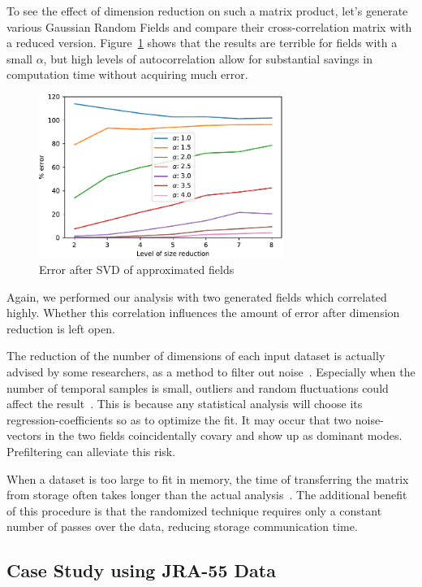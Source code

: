 \documentclass[ijgi,article,submit,moreauthors,pdftex,10pt,a4paper]{Definitions/mdpi}
\begin{document}
To see the effect of dimension reduction on such a matrix product, let's generate various Gaussian Random Fields and compare their cross-correlation matrix with a reduced version. Figure~\ref{fig:plotRandomisedSizeReducedMatrixProduct} shows that the results are terrible for fields with a small $\alpha$, but high levels of autocorrelation allow for substantial savings in computation time without acquiring much error.

\begin{figure}[H]
\centering
\includegraphics[width=80mm]{Results/plotRandomisedSizeReducedMatrixProduct.pdf}
\caption[Error after SVD]{Error after SVD of approximated fields}
\label{fig:plotRandomisedSizeReducedMatrixProduct}
\end{figure}

Again, we performed our analysis with two generated fields which correlated highly. Whether this correlation influences the amount of error after dimension reduction is left open.

The reduction of the number of dimensions of each input dataset is actually advised by some researchers, as a method to filter out noise~\cite{Barnett1987}. Especially when the number of temporal samples is small, outliers and random fluctuations could affect the result~\cite{Bretherton1992}. This is because any statistical analysis will choose its regression-coefficients so as to optimize the fit. It may occur that two noise-vectors in the two fields coincidentally covary and show up as dominant modes. Prefiltering can alleviate this risk.

When a dataset is too large to fit in memory, the time of transferring the matrix from storage often takes longer than the actual analysis~\cite{Halko2011}. The additional benefit of this procedure is that the randomized technique requires only a constant number of passes over the data, reducing storage communication time.

\subsection{Case Study using JRA-55 Data}
\label{sec:Results/Case Study using JRA-55 Data}
\end{document}
